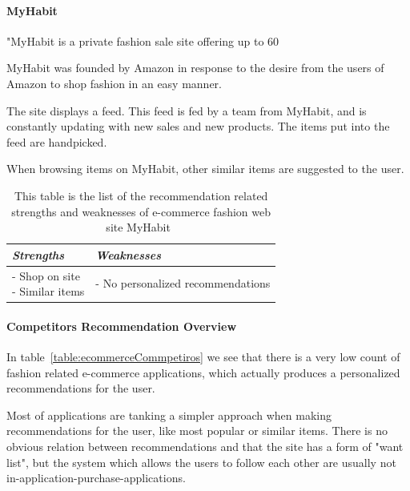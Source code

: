 \paragraph{MyHabit} %
\label{par:myhabit}
    "MyHabit is a private fashion sale site offering up to 60%

    MyHabit was founded by Amazon in response to the desire from the users of Amazon to shop fashion in an easy manner.

    The site displays a feed.
    This feed is fed by a team from MyHabit, and is constantly updating with new sales and new products.
    The items put into the feed are handpicked.

    When browsing items on MyHabit, other similar items are suggested to the user.
    \begin{table}[H]
        \centering
        \begin{tabular}{l|l}
            \toprule
            \emph{Strengths} & \emph{Weaknesses} \\ \hline
            \pbox{9cm}{
                - Shop on site \\
                - Similar items
            } & \pbox{9cm}{
                - No personalized recommendations \\
            } \\ \bottomrule
        \end{tabular}
        \caption[Recommendation related strengths and weaknesses of MyHabit~\cite{MyHabit}]{This table is the list of the recommendation related strengths and weaknesses of e-commerce fashion web site MyHabit~\cite{MyHabit}}
        \label{table:ecommenreceMyHabit}
    \end{table}

\paragraph{Competitors Recommendation Overview} %
\label{par:competitors_recommendation_overview}
    In table~\ref{table:ecommerceCommpetiros} we see that there is a very low count of fashion related e-commerce applications, which actually produces a personalized recommendations for the user.

    Most of applications are tanking a simpler approach when making recommendations for the user, like most popular or similar items.
    There is no obvious relation between recommendations and that the site has a form of "want list", but the system which allows the users to follow each other are usually not in-application-purchase-applications.

